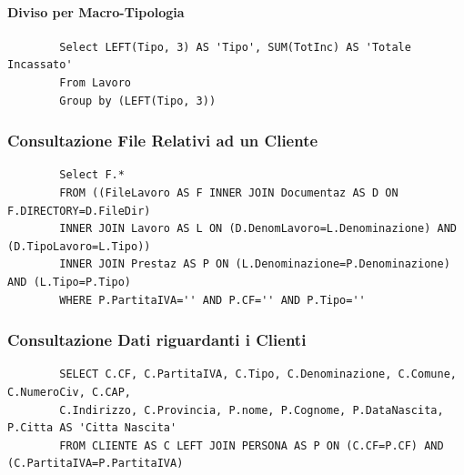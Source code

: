 \documentclass{elegantbook}
\begin{document}
\paragraph{Diviso per Macro-Tipologia}
	\begin{verbatim}
		Select LEFT(Tipo, 3) AS 'Tipo', SUM(TotInc) AS 'Totale Incassato'
		From Lavoro
		Group by (LEFT(Tipo, 3))
	\end{verbatim}
	\begin{figure}[H]
		\centering
	\end{figure}
\subsubsection{Consultazione File Relativi ad un Cliente}
	\begin{verbatim}
		Select F.*
		FROM ((FileLavoro AS F INNER JOIN Documentaz AS D ON F.DIRECTORY=D.FileDir)
		INNER JOIN Lavoro AS L ON (D.DenomLavoro=L.Denominazione) AND (D.TipoLavoro=L.Tipo))
		INNER JOIN Prestaz AS P ON (L.Denominazione=P.Denominazione) AND (L.Tipo=P.Tipo) 
		WHERE P.PartitaIVA='' AND P.CF='' AND P.Tipo=''
	\end{verbatim}
\subsubsection{Consultazione Dati riguardanti i Clienti}
	\begin{verbatim}
		SELECT C.CF, C.PartitaIVA, C.Tipo, C.Denominazione, C.Comune, C.NumeroCiv, C.CAP, 
		C.Indirizzo, C.Provincia, P.nome, P.Cognome, P.DataNascita, P.Citta AS 'Citta Nascita'
		FROM CLIENTE AS C LEFT JOIN PERSONA AS P ON (C.CF=P.CF) AND (C.PartitaIVA=P.PartitaIVA)
	\end{verbatim}
\begin{figure}[H]
	\centering
\end{figure}
\end{document}
